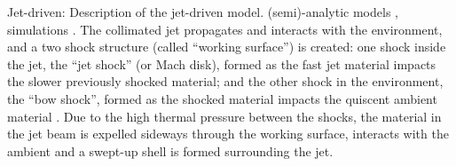 \documentclass[12pt]{mythesis}
\begin{document}

Jet-driven: Description of the jet-driven model. (semi)-analytic models \citep{raga1993, masson1993, ostriker2001}, simulations \citep{chernin1994, smith1997, suttner1997, downes1999, downes2007, rabenanahary2022}. The collimated jet propagates and interacts with the environment, and a two shock structure (called ``working surface'') is created: one shock inside the jet, the ``jet shock'' (or Mach disk), formed as the fast jet material impacts the slower previously shocked material; and the other shock in the environment, the ``bow shock'', formed as the shocked material impacts the quiscent ambient material \citep{hollenbach1997, raga2021}.
Due to the high thermal pressure between the shocks, the material in the jet beam is expelled sideways through the working surface, interacts with the ambient and a swept-up shell is formed surrounding the jet. 


\end{document}
